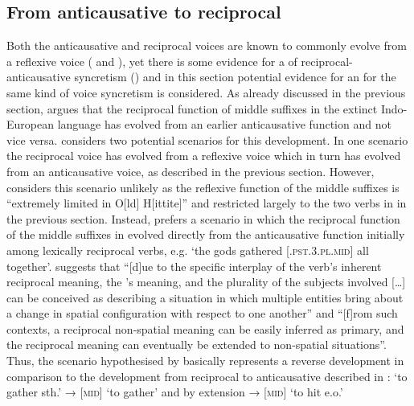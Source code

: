 \subsection{From anticausative to reciprocal} \label{diachrony:antc2recp}
Both the anticausative and reciprocal voices are known to commonly evolve from a reflexive voice ( and ), yet there is some evidence for a  of reciprocal-anticausative syncretism () and in this section potential evidence for an  for the same kind of voice syncretism is considered. As already discussed in the previous section, \citet{inglese:2017, inglese:2020} argues that the reciprocal function of middle suffixes in the extinct Indo-European language  has evolved from an earlier anticausative function and not vice versa. \citeauthor{inglese:2020} considers two potential scenarios for this development. In one scenario the reciprocal voice has evolved from a reflexive voice which in turn has evolved from an anticausative voice, as described in the previous section. However, \citet[238]{inglese:2020} considers this scenario unlikely as the reflexive function of the middle suffixes is “extremely limited in O[ld] H[ittite]” and restricted largely to the two verbs in  in the previous section. Instead, \citet[238]{inglese:2020} prefers a scenario in which the reciprocal function of the middle suffixes in  evolved directly from the anticausative function initially among lexically reciprocal verbs, e.g. ‘the gods gathered [.\textsc{pst.3.pl.mid}] all together’. \citet[239]{inglese:2020} suggests that “[d]ue to the specific interplay of the verb’s inherent reciprocal meaning, the ’s  meaning, and the plurality of the subjects involved […] can be conceived as describing a situation in which multiple entities bring about a change in spatial configuration with respect to one another” and “[f]rom such contexts, a reciprocal non-spatial meaning can be easily inferred as primary, and the reciprocal meaning can eventually be extended to non-spatial situations”. Thus, the scenario hypothesised by \citeauthor{inglese:2020} basically represents a reverse development in comparison to the development from reciprocal to anticausative described in :  ‘to gather sth.’ →  [\textsc{mid}] ‘to gather’ and by extension →  [\textsc{mid}] ‘to hit e.o.’

